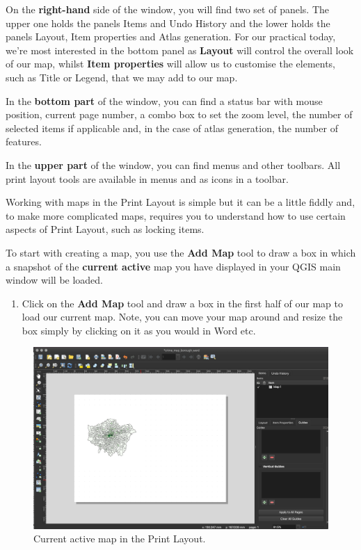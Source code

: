 \documentclass[
]{book}
\providecommand{\tightlist}{%
  \setlength{\itemsep}{0pt}\setlength{\parskip}{0pt}}
\begin{document}
On the \textbf{right-hand} side of the window, you will find two set of panels. The upper one holds the panels Items and Undo History and the lower holds the panels Layout, Item properties and Atlas generation. For our practical today, we're most interested in the bottom panel as \textbf{Layout} will control the overall look of our map, whilst \textbf{Item properties} will allow us to customise the elements, such as Title or Legend, that we may add to our map.

In the \textbf{bottom part} of the window, you can find a status bar with mouse position, current page number, a combo box to set the zoom level, the number of selected items if applicable and, in the case of atlas generation, the number of features.

In the \textbf{upper part} of the window, you can find menus and other toolbars. All print layout tools are available in menus and as icons in a toolbar.

Working with maps in the Print Layout is simple but it can be a little fiddly and, to make more complicated maps, requires you to understand how to use certain aspects of Print Layout, such as locking items.

To start with creating a map, you use the \textbf{Add Map} tool to draw a box in which a snapshot of the \textbf{current active} map you have displayed in your QGIS main window will be loaded.

\begin{enumerate}
\def\labelenumi{\arabic{enumi}.}
\tightlist
\item
  Click on the \textbf{Add Map} tool and draw a box in the first half of our map to load our current map. Note, you can move your map around and resize the box simply by clicking on it as you would in Word etc.
\end{enumerate}

\begin{figure}

{\centering \includegraphics[width=37.08in]{images/w03/map_layout} 

}

\caption{Current active map in the Print Layout.}\label{fig:03-map-print-layout}
\end{figure}
\end{document}
